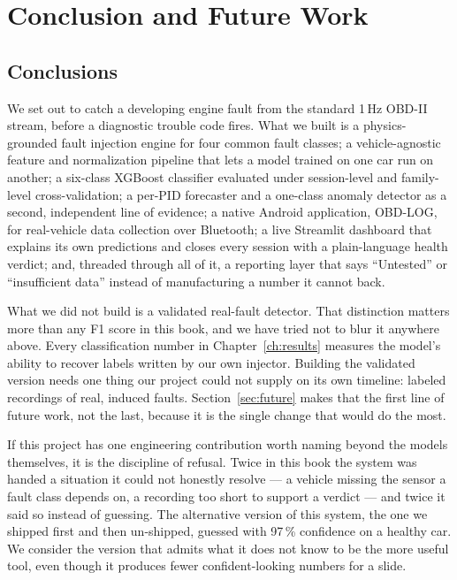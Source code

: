 \section{Conclusion and Future Work}
\label{ch:conclusion}

\subsection{Conclusions}

We set out to catch a developing engine fault from the standard 1\,Hz
OBD-II stream, before a diagnostic trouble code fires. What we built is a
physics-grounded fault injection engine for four common fault classes; a
vehicle-agnostic feature and normalization pipeline that lets a model
trained on one car run on another; a six-class XGBoost classifier evaluated
under session-level and family-level cross-validation; a per-PID
forecaster and a one-class anomaly detector as a second, independent line
of evidence; a native Android application, OBD-LOG, for real-vehicle data
collection over Bluetooth; a live Streamlit dashboard that explains its own
predictions and closes every session with a plain-language health verdict;
and, threaded through all of it, a reporting layer that says ``Untested''
or ``insufficient data'' instead of manufacturing a number it cannot back.

What we did not build is a validated real-fault detector. That distinction
matters more than any F1 score in this book, and we have tried not to blur
it anywhere above. Every classification number in Chapter~\ref{ch:results}
measures the model's ability to recover labels written by our own
injector. Building the validated version needs one thing our project could
not supply on its own timeline: labeled recordings of real, induced faults.
Section~\ref{sec:future} makes that the first line of future work, not the
last, because it is the single change that would do the most.

If this project has one engineering contribution worth naming beyond the
models themselves, it is the discipline of refusal. Twice in this book the
system was handed a situation it could not honestly resolve --- a vehicle
missing the sensor a fault class depends on, a recording too short to
support a verdict --- and twice it said so instead of guessing. The
alternative version of this system, the one we shipped first and then
un-shipped, guessed with 97\,\% confidence on a healthy car. We consider the
version that admits what it does not know to be the more useful tool, even
though it produces fewer confident-looking numbers for a slide.

